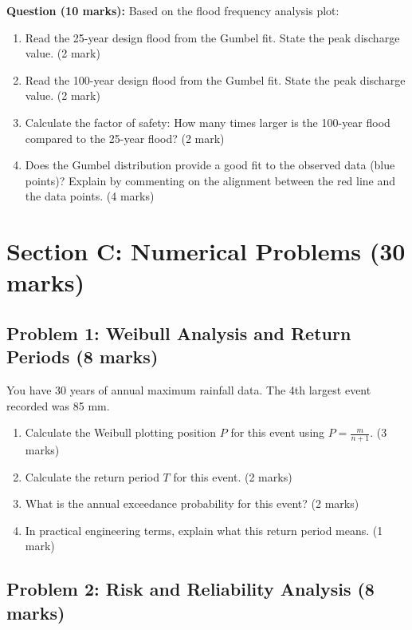 \documentclass[11pt,a4paper]{article}
\begin{document}
\textbf{Question (10 marks):} Based on the flood frequency analysis plot:
\begin{enumerate}[label=\alph*)]
    \item Read the 25-year design flood from the Gumbel fit. State the peak discharge value. (2 mark)
    \item Read the 100-year design flood from the Gumbel fit. State the peak discharge value. (2 mark)
    \item Calculate the factor of safety: How many times larger is the 100-year flood compared to the 25-year flood? (2 mark)
    \item Does the Gumbel distribution provide a good fit to the observed data (blue points)? Explain by commenting on the alignment between the red line and the data points. (4 marks)
\end{enumerate}

\vspace{3cm}

\newpage

\section*{Section C: Numerical Problems (30 marks)}

\subsection*{Problem 1: Weibull Analysis and Return Periods (8 marks)}

You have 30 years of annual maximum rainfall data. The 4th largest event recorded was 85 mm.

\begin{enumerate}[label=\alph*)]
    \item Calculate the Weibull plotting position $P$ for this event using $P = \frac{m}{n+1}$. (3 marks)
    \item Calculate the return period $T$ for this event. (2 marks)
    \item What is the annual exceedance probability for this event? (2 marks)
    \item In practical engineering terms, explain what this return period means. (1 mark)
\end{enumerate}

\vspace{8cm}

\subsection*{Problem 2: Risk and Reliability Analysis (8 marks)}
\end{document}

